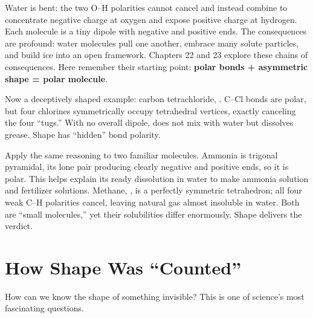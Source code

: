 Water is bent: the two O--H polarities cannot cancel and instead combine to concentrate negative charge at oxygen and expose positive charge at hydrogen. Each molecule is a tiny dipole with negative and positive ends. The consequences are profound: water molecules pull one another, embrace many solute particles, and build ice into an open framework. Chapters 22 and 23 explore these chains of consequences. Here remember their starting point: \textbf{polar bonds + asymmetric shape = polar molecule}.

Now a deceptively shaped example: carbon tetrachloride, . C--Cl bonds are polar, but four chlorines symmetrically occupy tetrahedral vertices, exactly canceling the four ``tugs.'' With no overall dipole,  does not mix with water but dissolves grease. Shape has ``hidden'' bond polarity.

Apply the same reasoning to two familiar molecules. Ammonia is trigonal pyramidal, its lone pair producing clearly negative and positive ends, so it is polar. This helps explain its ready dissolution in water to make ammonia solution and fertilizer solutions. Methane, , is a perfectly symmetric tetrahedron; all four weak C--H polarities cancel, leaving natural gas almost insoluble in water. Both are ``small molecules,'' yet their solubilities differ enormously. Shape delivers the verdict.

\section{How Shape Was ``Counted''}

How can we know the shape of something invisible? This is one of science's most fascinating questions.

